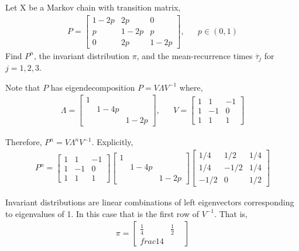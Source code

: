\pagebreak
\begin{problem}[Exercise 4.5]
Let X be a Markov chain with transition matrix,
\begin{align*}
    P = \left[\begin{array}{ccc}1-2p & 2p & 0 \\ p & 1-2p & p \\ 0 & 2p & 1-2p\end{array}\right], && p\in(0,1)
\end{align*}
    Find \( P^n \), the invariant distribution \( \pi \), and the mean-recurrence times \( \overline{\tau}_j \) for \( j=1,2,3 \).
\end{problem}

\begin{solution}[Solution]
    Note that \( P \) has eigendecomposition \( P = V\Lambda V^{-1} \) where,
    \begin{align*}
        \Lambda =
        \left[\begin{array}{rrr}1 \\ &1-4p \\ && 1-2p\end{array}\right]
        ,&&
        V = \left[\begin{array}{rrr} 1 & 1 & -1 \\ 1 & -1 & 0 \\ 1 & 1 & 1\end{array}\right]
    \end{align*}
    
    Therefore, \( P^n = V\Lambda^n V^{-1} \). Explicitly,
    \begin{align*}
        P^n = 
        \left[\begin{array}{rrr} 1 & 1 & -1 \\ 1 & -1 & 0 \\ 1 & 1 & 1\end{array}\right]
        \left[\begin{array}{rrr}1 \\ &1-4p \\ && 1-2p\end{array}\right]
        \left[\begin{array}{rrr}1/4 & 1/2 & 1/4 \\ 1/4 & -1/2 & 1/4 \\ -1/2 & 0 & 1/2\end{array}\right]
    \end{align*}
    
    Invariant distributions are linear combinations of left eigenvectors corresponding to eigenvalues of 1. In this case that is the first row of \( V^{-1} \). That is,
    \begin{align*}
        \pi = \left[\begin{array}{rrr}\frac{1}{4} & \frac{1}{2} & \\frac{1}{4}\end{array}\right]
    \end{align*}


\end{solution}
